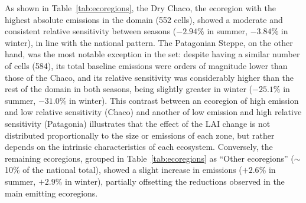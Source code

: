 \documentclass[conference,a4paper]{IEEEtran}   %
\begin{document}
As shown in Table~\ref{tab:ecoregions}, the Dry Chaco, the ecoregion with the highest absolute emissions in the domain (552 cells), showed a moderate and consistent relative sensitivity between seasons ($-2.94\%$ in summer, $-3.84\%$ in winter), in line with the national pattern. The Patagonian Steppe, on the other hand, was the most notable exception in the set: despite having a similar number of cells (584), its total baseline emissions were orders of magnitude lower than those of the Chaco, and its relative sensitivity was considerably higher than the rest of the domain in both seasons, being slightly greater in winter ($-25.1\%$ in summer, $-31.0\%$ in winter). This contrast between an ecoregion of high emission and low relative sensitivity (Chaco) and another of low emission and high relative sensitivity (Patagonia) illustrates that the effect of the LAI change is not distributed proportionally to the size or emissions of each zone, but rather depends on the intrinsic characteristics of each ecosystem. Conversely, the remaining ecoregions, grouped in Table~\ref{tab:ecoregions} as ``Other ecoregions'' ($\sim$10\% of the national total), showed a slight increase in emissions ($+2.6\%$ in summer, $+2.9\%$ in winter), partially offsetting the reductions observed in the main emitting ecoregions.
\end{document}
